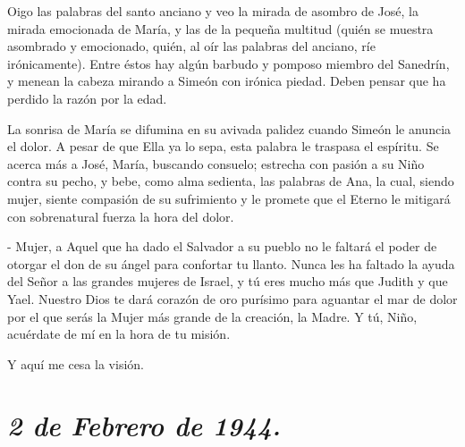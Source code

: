 \documentclass[12pt]{book} %
\begin{document}
Oigo las palabras del santo anciano y veo la mirada de asombro de José, la mirada emocionada de María, y las de la pequeña multitud (quién se muestra asombrado y emocionado, quién, al oír las palabras del anciano, ríe irónicamente). Entre éstos hay algún barbudo y pomposo miembro del Sanedrín, y menean la cabeza mirando a Simeón con irónica piedad. Deben pensar que ha perdido la razón por la edad. 

La sonrisa de María se difumina en su avivada palidez cuando Simeón le anuncia el dolor. A pesar de que Ella ya lo sepa, esta palabra le traspasa el espíritu. Se acerca más a José, María, buscando consuelo; estrecha con pasión a su Niño contra su pecho, y bebe, como alma sedienta, las palabras de Ana, la cual, siendo mujer, siente compasión de su sufrimiento y le promete que el Eterno le mitigará con sobrenatural fuerza la hora del dolor. 

- Mujer, a Aquel que ha dado el Salvador a su pueblo no le faltará el poder de otorgar el don de su ángel para confortar tu llanto. Nunca les ha faltado la ayuda del Señor a las grandes mujeres de Israel, y tú eres mucho más que Judith y que Yael. Nuestro Dios te dará corazón de oro purísimo para aguantar el mar de dolor por el que serás la Mujer más grande de la creación, la Madre. Y tú, Niño, acuérdate de mí en la hora de tu misión. 

Y aquí me cesa la visión. 

\section*{\normalfont\normalsize\textit{2 de Febrero de 1944.}}
 
\end{document}
